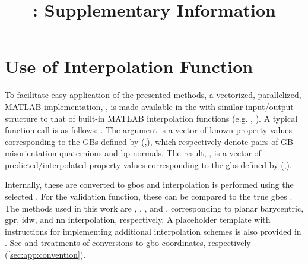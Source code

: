 \documentclass[preprint,12pt]{elsarticle}
\begin{document}
\sloppy %

\begin{frontmatter}

\title{\mytitleone{}: Supplementary Information}



\end{frontmatter}

\tableofcontents

\section{Use of Interpolation Function}
\label{sec:methods:repofn}
To facilitate easy application of the presented methods, a vectorized, parallelized, MATLAB implementation, , is made available in the \vfzorepo{} \cite{bairdFiveDegreeofFreedom5DOF2020} with similar input/output structure to that of built-in MATLAB interpolation functions (e.g. , ). A typical function call is as follows: . The argument  is a vector of known property values corresponding to the GBs defined by (,), which respectively denote pairs of GB misorientation quaternions and \gls{bp} normals. The result, , is a vector of predicted/interpolated property values corresponding to the \outpt{} \glspl{gb} defined by (,). %

Internally, these are converted to \glspl{gbo} and interpolation is performed using the selected . For the validation function, these can be compared to the true \glspl{gbe} . The methods used in this work are , , , and , corresponding to planar barycentric, \gls{gpr}, \gls{idw}, and \gls{nn} interpolation, respectively. A placeholder template with instructions for implementing additional interpolation schemes is also provided in . See \citet{francisGeodesicOctonionMetric2019} and  \cite{bairdFiveDegreeofFreedom5DOF2020} treatments of conversions to \gls{gbo} coordinates, respectively (\cref{sec:app:convention}).
\end{document}
